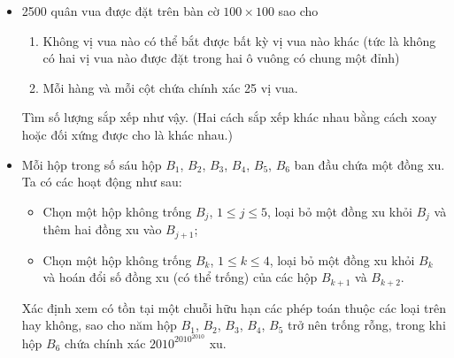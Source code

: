 \documentclass[11pt]{scrartcl}
\begin{document}
\begin{itemize}[label=, leftmargin=0em, itemsep=-0em]
\begin{btvn}
    \end{btvn}
    \item \begin{btvn}
        2500 quân vua được đặt trên bàn cờ $100 \times 100$ sao cho
        \begin{enumerate}
            \item Không vị vua nào có thể bắt được bất kỳ vị vua nào khác (tức là không có hai vị vua nào được đặt trong hai ô vuông có chung một đỉnh)
            \item Mỗi hàng và mỗi cột chứa chính xác 25 vị vua.
        \end{enumerate}
        Tìm số lượng sắp xếp như vậy. (Hai cách sắp xếp khác nhau bằng cách xoay hoặc đối xứng được cho là khác nhau.)

    \end{btvn}
    
    \item \begin{btvn}
        Mỗi hộp trong số sáu hộp $B_1$, $B_2$, $B_3$, $B_4$, $B_5$, $B_6$ ban đầu chứa một đồng xu. Ta có các hoạt động như sau:

        \begin{itemize}[label=-]
            \item {} Chọn một hộp không trống $B_j$, $1\leq j \leq 5$, loại bỏ một đồng xu khỏi $B_j$ và thêm hai đồng xu vào $B_{j+1}$;
            \item {} Chọn một hộp không trống $B_k$, $1\leq k \leq 4$, loại bỏ một đồng xu khỏi $B_k$ và hoán đổi số đồng xu (có thể trống) của các hộp $B_{k+1}$ và $ B_{k+2}$.

        \end{itemize}
        Xác định xem có tồn tại một chuỗi hữu hạn các phép toán thuộc các loại trên hay không, sao cho năm hộp $B_1$, $B_2$, $B_3$, $B_4$, $B_5$ trở nên trống rỗng, trong khi hộp $B_6$ chứa chính xác $2010^ {2010^{2010}}$ xu.
    \end{btvn}


\end{itemize}
\end{document}
